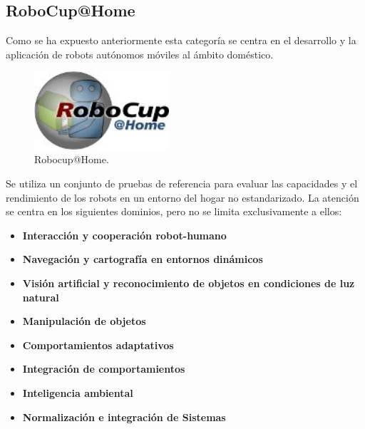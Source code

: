 \subsection{RoboCup@Home}
\label{cap:robocuphome}
Como se ha expuesto anteriormente esta categoría se centra en el desarrollo y la aplicación de robots autónomos móviles al ámbito doméstico.
\begin{figure}[hbtp]  
  \begin{center}
    \includegraphics[width=5cm]{img/cap1/logoRobocupHome}
  \end{center}
  \caption{Robocup@Home.}
  \label{fig:logoRobocupHome}
\end{figure}

Se utiliza un conjunto de pruebas de referencia  para evaluar las capacidades y el rendimiento de los robots en un entorno del hogar no estandarizado. La atención se centra en los siguientes dominios, pero no se limita exclusivamente a ellos:

\begin{itemize}
\item \textbf{Interacción y cooperación robot-humano} 
\item \textbf{Navegación y cartografía en entornos dinámicos} 
\item \textbf{Visión artificial y reconocimiento de objetos en condiciones de luz natural} 
\item \textbf{Manipulación de objetos} 
\item \textbf{Comportamientos adaptativos} 
\item \textbf{Integración de comportamientos}
\item \textbf{Inteligencia ambiental}  
\item \textbf{Normalización e integración de Sistemas}  
\end{itemize}



